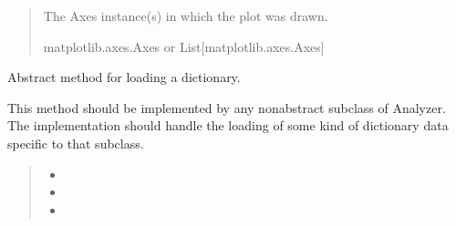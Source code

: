 \documentclass[letterpaper,10pt,english]{sphinxmanual}
\begin{document}
\begin{fulllineitems}
\begin{fulllineitems}
\begin{quote}
\begin{description}
\sphinxAtStartPar
{} \textendash{} The Axes instance(s) in which the plot was drawn.

\sphinxAtStartPar
matplotlib.axes.Axes or List{[}matplotlib.axes.Axes{]}

\end{description}\end{quote}

\end{fulllineitems}


\begin{fulllineitems}
\label{\detokenize{forensicfit.core.analyzer:forensicfit.core.analyzer.Analyzer.load_dict}}
\pysigstartsignatures
{}
\pysigstopsignatures
\sphinxAtStartPar
Abstract method for loading a dictionary.

\sphinxAtStartPar
This method should be implemented by any non\sphinxhyphen{}abstract subclass of
Analyzer. The implementation should handle the loading of some kind
of dictionary data specific to that subclass.
\begin{quote}\begin{description}
\sphinxAtStartPar
\begin{itemize}
\item {} 
\sphinxAtStartPar
{}

\item {} 
\sphinxAtStartPar
{}

\item {} 
\sphinxAtStartPar
{}

\end{itemize}


\end{description}\end{quote}

\end{fulllineitems}



\end{fulllineitems}
\end{document}
